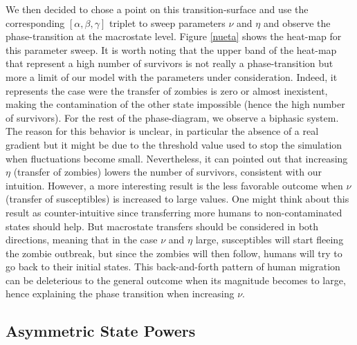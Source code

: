 \documentclass[11pt]{article} %
\begin{document}
We then decided to chose a point on this transition-surface and use the corresponding $[\alpha, \beta, \gamma]$ triplet to sweep parameters $\nu$ and $\eta$ and observe the phase-transition at the macrostate level. Figure \ref{nueta} shows the heat-map for this parameter sweep. It is worth noting that the upper band of the heat-map that represent a high number of survivors is not really a phase-transition but more a limit of our model with the parameters under consideration. Indeed, it represents the case were the transfer of zombies is zero or almost inexistent, making the contamination of the other state impossible (hence the high number of survivors). For the rest of the phase-diagram, we observe a biphasic system. The reason for this behavior is unclear, in particular the absence of a real gradient but it might be due to the threshold value used to stop the simulation when fluctuations become small. Nevertheless, it can pointed out that increasing $\eta$ (transfer of zombies) lowers the number of survivors, consistent with our intuition. However, a more interesting result is the less favorable outcome when $\nu$ (transfer of susceptibles) is increased to large values. One might think about this result as counter-intuitive since transferring more humans to non-contaminated states should help. But macrostate transfers should be considered in both directions, meaning that in the case $\nu$ and $\eta$ large, susceptibles will start fleeing the zombie outbreak, but since the zombies will then follow, humans will try to go back to their initial states. This back-and-forth pattern of human migration can be deleterious to the general outcome when its magnitude becomes to large, hence explaining the phase transition when increasing $\nu$.



\subsection{Asymmetric State Powers}\indent
\label{sec:asym}
\end{document}

